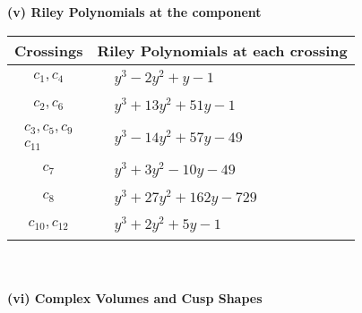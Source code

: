 \documentclass[1p]{elsarticle_modified}
\theoremstyle{definition}
\begin{document}
\newpage\renewcommand{\arraystretch}{1}
\flushleft \textbf{(v) Riley Polynomials at the component}\newline \\
\begin{tabular}{m{50pt}|m{274pt}}
Crossings & \hspace{64pt}Riley Polynomials at each crossing \\
\hline $$\begin{aligned}c_{1},c_{4}\end{aligned}$$&$\begin{aligned}
&y^3-2 y^2+y-1
\end{aligned}$\\
\hline $$\begin{aligned}c_{2},c_{6}\end{aligned}$$&$\begin{aligned}
&y^3+13 y^2+51 y-1
\end{aligned}$\\
\hline $$\begin{aligned}c_{3},c_{5},c_{9}\\c_{11}\end{aligned}$$&$\begin{aligned}
&y^3-14 y^2+57 y-49
\end{aligned}$\\
\hline $$\begin{aligned}c_{7}\end{aligned}$$&$\begin{aligned}
&y^3+3 y^2-10 y-49
\end{aligned}$\\
\hline $$\begin{aligned}c_{8}\end{aligned}$$&$\begin{aligned}
&y^3+27 y^2+162 y-729
\end{aligned}$\\
\hline $$\begin{aligned}c_{10},c_{12}\end{aligned}$$&$\begin{aligned}
&y^3+2 y^2+5 y-1
\end{aligned}$\\
\hline
\end{tabular}\\~\\
\newpage\flushleft \textbf{(vi) Complex Volumes and Cusp Shapes}
\end{document}
